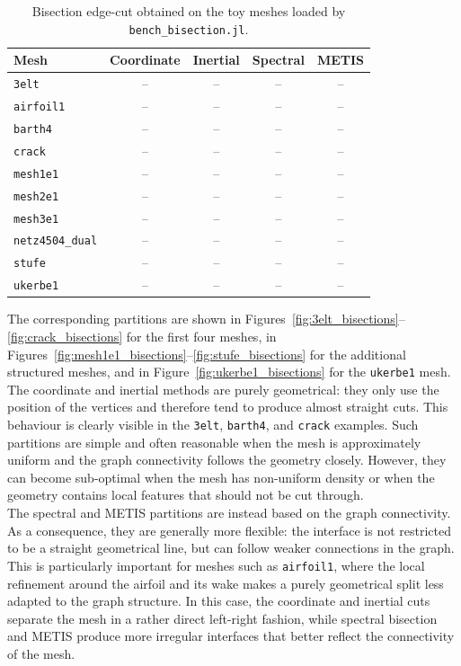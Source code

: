 \documentclass[unicode,10pt,a4paper,oneside,numbers=endperiod,openany]{scrartcl}
\begin{document}
\begin{table}[h]
\centering
\begin{tabular}{lcccc}
\hline
\textbf{Mesh} & \textbf{Coordinate} & \textbf{Inertial} & \textbf{Spectral} & \textbf{METIS} \\
\hline
\texttt{3elt}          & -- & -- & -- & -- \\
\texttt{airfoil1}      & -- & -- & -- & -- \\
\texttt{barth4}        & -- & -- & -- & -- \\
\texttt{crack}         & -- & -- & -- & -- \\
\texttt{mesh1e1}       & -- & -- & -- & -- \\
\texttt{mesh2e1}       & -- & -- & -- & -- \\
\texttt{mesh3e1}       & -- & -- & -- & -- \\
\texttt{netz4504\_dual} & -- & -- & -- & -- \\
\texttt{stufe}         & -- & -- & -- & -- \\
\texttt{ukerbe1}       & -- & -- & -- & -- \\
\hline
\end{tabular}
\caption{Bisection edge-cut obtained on the toy meshes loaded by \texttt{bench\_bisection.jl}.}
\label{tab:bisection_edgecuts}
\end{table}

The corresponding partitions are shown in Figures~\ref{fig:3elt_bisections}--\ref{fig:crack_bisections} for the first four meshes, in Figures~\ref{fig:mesh1e1_bisections}--\ref{fig:stufe_bisections} for the additional structured meshes, and in Figure~\ref{fig:ukerbe1_bisections} for the \texttt{ukerbe1} mesh.
The coordinate and inertial methods are purely geometrical: they only use the position of the
vertices and therefore tend to produce almost straight cuts. This behaviour is clearly visible in
the \texttt{3elt}, \texttt{barth4}, and \texttt{crack} examples. Such partitions are simple and often
reasonable when the mesh is approximately uniform and the graph connectivity follows the
geometry closely. However, they can become sub-optimal when the mesh has non-uniform density
or when the geometry contains local features that should not be cut through.\\

The spectral and METIS partitions are instead based on the graph connectivity. As a consequence,
they are generally more flexible: the interface is not restricted to be a straight geometrical line,
but can follow weaker connections in the graph. This is particularly important for meshes such as
\texttt{airfoil1}, where the local refinement around the airfoil and its wake makes a purely
geometrical split less adapted to the graph structure. In this case, the coordinate and inertial
cuts separate the mesh in a rather direct left-right fashion, while spectral bisection and METIS
produce more irregular interfaces that better reflect the connectivity of the mesh.\\
\end{document}
